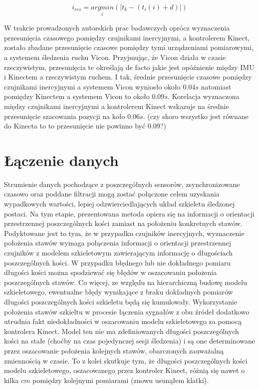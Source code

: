 \begin{equation}
	i_{res} = \underset{i}{argmin}(|t_k-(t_i(i) + d)|)
	\label{eq:dec}
\end{equation}

W trakcie prowadzonych autorskich prac badawczych oprócz wyznaczenia przesunięcia czasowego pomiędzy czujnikami inercyjnymi, a kontrolerem Kinect, zostało zbadane przesunięcie czasowe pomiędzy tymi urządzeniami pomiarowymi, a systemem śledzenia ruchu Vicon. Przyjmując, że Vicon działa w czasie rzeczywistym, przesunięcia te określają de facto jakie jest opóźnienie między IMU i Kinectem a rzeczywistym ruchem. I tak, średnie przesunięcie czasowe pomiędzy czujnikami inercyjnymi a systemem Vicon wyniosło około $0.04s$ natomiast pomiędzy Kinectem a systemem Vicon to około $0.09s$. Korelacja wyznaczona między czujnikami inercyjnymi a kontrolerem Kinect wskazuje na średnie przesunięcie szacowania pozycji na koło $0.06s$. (czy skoro wszystko jest równane do Kinecta to to przesunięcie nie powinno być 0.09?)

\section{Łączenie danych}

Strumienie danych pochodzące z poszczegółnych sensorów, zsynchronizowane czasowo oraz poddane filtracji mogą zostać połączone celem uzyskania wypadkowych wartości, lepiej odzwierciedlających układ szkieletu śledzonej postaci. Na tym etapie, prezentowana metoda opiera się na informacji o orientacji przestrzennej poszczególnych kości zamiast na położeniu konkretnych stawów. Podyktowane jest to tym, że w przypadku czujników inercyjnych, wyznaczenie położenia stawów wymaga połączenia informacji o orientacji przestrzennej czujników z modelem szkieletowym zawierającym informację o długościach poszczególnych kości. W przypadku błędnego lub nie dokładnego pomiaru długości kości można spodziewać się błędów w oszacowaniu położenia poszczególnych stawów. Co więcej, ze względu na hierarchiczną budowę modelu szkieletowego, ewentualne błędy wynikające z braku dokładnych pomiarów długości poszczególnych kości szkieletu będą się kumulowały. 
Wykorzystanie położenia stawów szkieltu w procesie łączenia sygnałów z obu źródeł dodatkowo utrudnia fakt niedokładności w oszacowaniu modelu szkieletowego za pomocą kontrolera Kinect. Model ten nie ma zdefiniowanych długości poszczególnych kości na stałe (choćby na czas pojedynczej sesji śledzenia) i są one determinowane przez oszacowanie położenia kolejnych stawów, obarczonych zauważalną zmiennością w czasie. To z kolei skutkuje tym, że długości poszczególnych kości modelu szkieletowego, oszacowanego przez kontroler Kinect, różnią się nawet o kilka $cm$ pomiędzy kolejnymi pomiarami (znowu usunąłem klatki).\\


